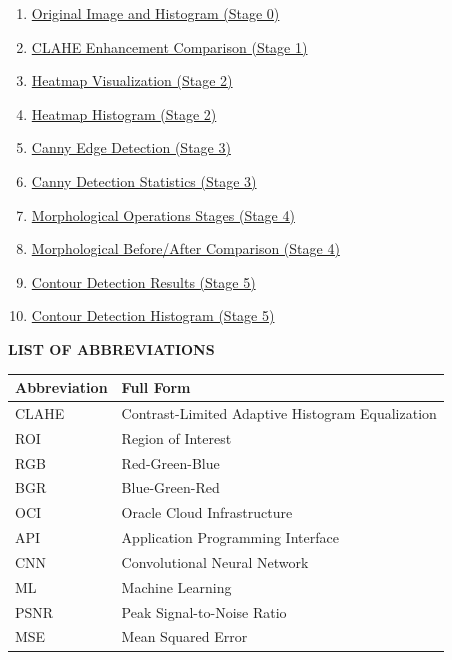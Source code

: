 \documentclass[12pt,a4paper]{article}
\begin{document}
\begin{enumerate}

    \item \hyperlink{fig:stage0}{Original Image and Histogram (Stage 0)}
    \item \hyperlink{fig:stage1a}{CLAHE Enhancement Comparison (Stage 1)}
    \item \hyperlink{fig:stage2a}{Heatmap Visualization (Stage 2)}
    \item \hyperlink{fig:stage2b}{Heatmap Histogram (Stage 2)}
    \item \hyperlink{fig:stage3a}{Canny Edge Detection (Stage 3)}
    \item \hyperlink{fig:stage3b}{Canny Detection Statistics (Stage 3)}
    \item \hyperlink{fig:stage4a}{Morphological Operations Stages (Stage 4)}
    \item \hyperlink{fig:stage4b}{Morphological Before/After Comparison (Stage 4)}
    \item \hyperlink{fig:stage5a}{Contour Detection Results (Stage 5)}
    \item \hyperlink{fig:stage5b}{Contour Detection Histogram (Stage 5)}
\end{enumerate}

\newpage

\newpage
\begin{center}
    {\Large\textbf{LIST OF ABBREVIATIONS}}
\end{center}

\begin{table}[H]
\centering
\begin{tabular}{|l|l|}
\hline
\textbf{Abbreviation} & \textbf{Full Form} \\ \hline
CLAHE & Contrast-Limited Adaptive Histogram Equalization \\
ROI & Region of Interest \\
RGB & Red-Green-Blue \\
BGR & Blue-Green-Red \\
OCI & Oracle Cloud Infrastructure \\
API & Application Programming Interface \\
CNN & Convolutional Neural Network \\
ML & Machine Learning \\
PSNR & Peak Signal-to-Noise Ratio \\
MSE & Mean Squared Error \\
\hline
\end{tabular}
\end{table}
\end{document}
